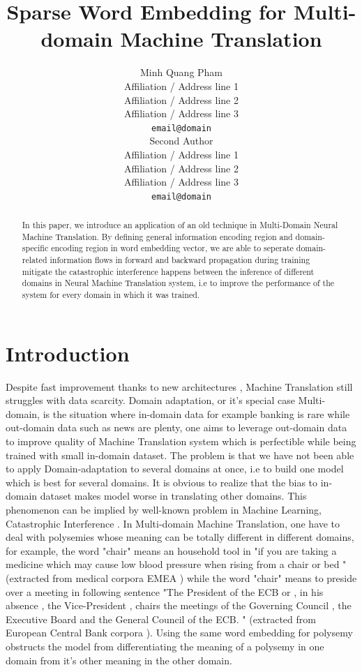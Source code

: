 \documentclass[11pt,a4paper]{article}
\title{Sparse Word Embedding for Multi-domain Machine Translation}
\author{Minh Quang Pham\\
  Affiliation / Address line 1 \\
  Affiliation / Address line 2 \\
  Affiliation / Address line 3 \\
  {\tt email@domain} \\\And
  Second Author \\
  Affiliation / Address line 1 \\
  Affiliation / Address line 2 \\
  Affiliation / Address line 3 \\
  {\tt email@domain} \\}
\date{}
\begin{document}
\maketitle
\begin{abstract}
In this paper, we introduce an application of an old technique \cite{P07-1033} in Multi-Domain Neural Machine Translation.  By defining general information encoding region and domain-specific encoding region in word embedding vector, we are able to  seperate domain-related information flows in forward and backward propagation during training
mitigate the catastrophic interference happens between the inference of different domains in Neural Machine Translation system, i.e to improve the performance of the system for every domain in which it was trained. 
\end{abstract}

\section{Introduction}
Despite fast improvement thanks to new architectures \cite{NIPS2017_7181} \cite{bahdanau2014neural} \cite{D13-1176} \cite{Sutskever2014Sequence}, Machine Translation still struggles with data scarcity. Domain adaptation, or it's special case Multi-domain, is the situation where in-domain data for example banking is rare while out-domain data such as news are plenty, one aims to leverage out-domain data to improve quality of Machine Translation system which is perfectible while being trained with small in-domain dataset. The problem is that we have not been able to apply Domain-adaptation to several domains at once, i.e to build one model which is best for several domains. It is obvious to realize that the bias to in-domain dataset makes model worse in translating other domains. This phenomenon can be implied by well-known problem in Machine Learning, Catastrophic Interference \cite{Michael1989Catastrophic}. In Multi-domain Machine Translation, one have to deal with polysemies whose meaning can be totally different in different domains, for example, the word "chair" means an household tool in "if you are taking a medicine which may cause low blood pressure when rising from a chair or bed " (extracted from medical corpora EMEA \cite{Tiedemann2009RANLP5}) while the word "chair" means to preside over a meeting in following sentence "The President of the ECB or , in his absence , the Vice-President , chairs the meetings of the Governing Council , the Executive Board and the General Council of the ECB. " (extracted from European Central Bank corpora \cite{Tiedemann2009RANLP5}). Using the same word embedding for polysemy obstructs the model from differentiating the meaning of a polysemy in one domain from it's other meaning in the other domain. 
\end{document}

